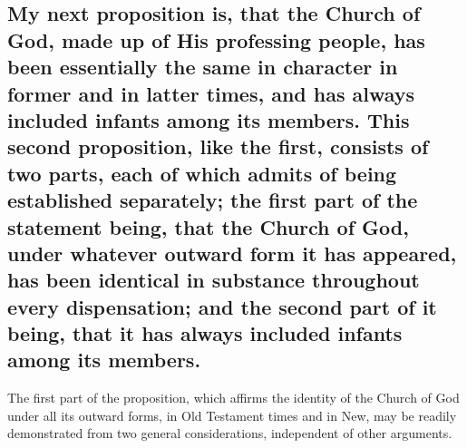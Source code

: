 \documentclass[]{book}
\begin{document}
\hypertarget{my-next-proposition-is-that-the-church-of-god-made-up-of-his-professing-people-has-been-essentially-the-same-in-character-in-former-and-in-latter-times-and-has-always-included-infants-among-its-members.-this-second-proposition-like-the-first-consists-of-two-parts-each-of-which-admits-of-being-established-separately-the-first-part-of-the-statement-being-that-the-church-of-god-under-whatever-outward-form-it-has-appeared-has-been-identical-in-substance-throughout-every-dispensation-and-the-second-part-of-it-being-that-it-has-always-included-infants-among-its-members.}{%
\subsection{My next proposition is, that the Church of God, made up of His professing people, has been essentially the same in character in former and in latter times, and has always included infants among its members. This second proposition, like the first, consists of two parts, each of which admits of being established separately; the first part of the statement being, that the Church of God, under whatever outward form it has appeared, has been identical in substance throughout every dispensation; and the second part of it being, that it has always included infants among its members.}\label{my-next-proposition-is-that-the-church-of-god-made-up-of-his-professing-people-has-been-essentially-the-same-in-character-in-former-and-in-latter-times-and-has-always-included-infants-among-its-members.-this-second-proposition-like-the-first-consists-of-two-parts-each-of-which-admits-of-being-established-separately-the-first-part-of-the-statement-being-that-the-church-of-god-under-whatever-outward-form-it-has-appeared-has-been-identical-in-substance-throughout-every-dispensation-and-the-second-part-of-it-being-that-it-has-always-included-infants-among-its-members.}}

The first part of the proposition, which affirms the identity of the Church of God under all its outward forms, in Old Testament times and in New, may be readily demonstrated from two general considerations, independent of other arguments.
\end{document}
